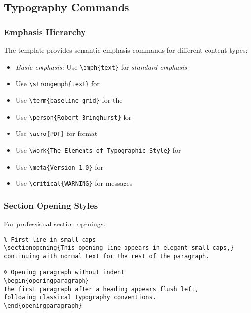 \subsection{Typography Commands}

\subsubsection{Emphasis Hierarchy}

The template provides semantic emphasis commands for different content types:

\begin{itemize}
\item \emph{Basic emphasis:} Use \verb|\emph{text}| for \emph{standard emphasis}
\item {} Use \verb|\strongemph{text}| for 
\item {} Use \verb|\term{baseline grid}| for the 
\item {} Use \verb|\person{Robert Bringhurst}| for 
\item {} Use \verb|\acro{PDF}| for  format
\item {} Use \verb|\work{The Elements of Typographic Style}| for 
\item {} Use \verb|\meta{Version 1.0}| for 
\item {} Use \verb|\critical{WARNING}| for  messages
\end{itemize}

\subsubsection{Section Opening Styles}

For professional section openings:

\begin{verbatim}
% First line in small caps
\sectionopening{This opening line appears in elegant small caps,}
continuing with normal text for the rest of the paragraph.

% Opening paragraph without indent
\begin{openingparagraph}
The first paragraph after a heading appears flush left,
following classical typography conventions.
\end{openingparagraph}
\end{verbatim}

